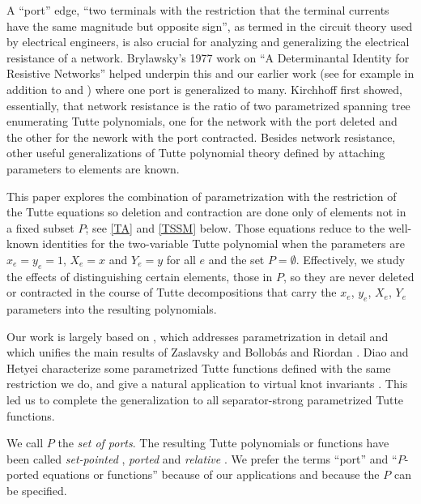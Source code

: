 \documentclass[12pt,leqno]{amsart}
\theoremstyle{remark}
\begin{document}
A ``port'' edge, ``two terminals with the restriction
that the terminal currents have the same magnitude but
opposite sign''\cite{CRCHandbookPorts}, as termed 
in the circuit theory 
used by electrical engineers,
is also crucial for analyzing and generalizing the
electrical resistance of a network.
Brylawsky's
1977 work on ``A Determinantal Identity for Resistive Networks''
\cite{BryDetIdResistive} helped underpin this and
our earlier work (see for example \cite{sdcOMP} in addition to
\cite{sdcPorted} and \cite{TutteEx}) where one port is
generalized to many.  Kirchhoff first showed, 
essentially, that network resistance is 
the ratio of two parametrized spanning tree enumerating
Tutte polynomials, one for the network with the port
deleted and the other for the nework with the port contracted.
Besides network resistance, other
useful generalizations of Tutte polynomial
theory defined by attaching parameters 
to elements are 
known\cite{Ellis-Monaghan-Traldi,Ellis-Monaghan-Merino-2}.

This paper explores the combination
of parametrization with the restriction
of the Tutte equations
so deletion and contraction are done
only of elements not in a fixed subset $P$;
see \eqref{TA} and \eqref{TSSM} below.
Those
equations reduce to the well-known identities for the 
two-variable Tutte polynomial
when the parameters are $x_e=y_e=1$, $X_e=x$ and $Y_e=y$ for all $e$ and 
the set $P=\emptyset$.
Effectively, we study the effects of distinguishing
certain elements, those in $P$, so they are never deleted or 
contracted in the course of Tutte decompositions
that carry the $x_e$, $y_e$, $X_e$, $Y_e$ parameters
into the resulting polynomials.

Our work is largely based 
on \cite{Ellis-Monaghan-Traldi}, which
addresses parametrization in detail and which unifies the main 
results of Zaslavsky \cite{MR93a:05047} and 
Bollob\'{a}s and Riordan \cite{BollobasRiordanTuttePolyColored}.
Diao and Hetyei \cite{RelTuttePoly} characterize some 
parametrized Tutte functions defined with the
same restriction we do, and give a natural
application to virtual knot invariants \cite{KauffmanVirtualKnots}.
This led us to complete the generalization to all
separator-strong parametrized Tutte functions.

We call $P$ the
\emph{set of ports}.  The resulting Tutte polynomials or functions
have been called \emph{set-pointed} \cite{SetPointedLV,SetPointedLV1}, 
\emph{ported} \cite{sdcPorted,TutteEx} and 
\emph{relative} \cite{RelTuttePoly}.  
We prefer the terms ``port'' and ``$P$-ported equations
or functions'' because of our applications
\cite{sdcOMP,TutteEx} and because 
the $P$ can be specified.
\end{document}
